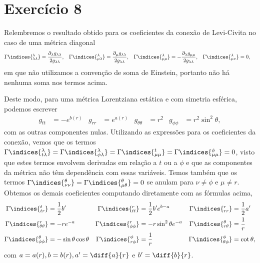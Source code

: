 \section*{Exercício 8}
Relembremos o resultado obtido para os coeficientes da conexão de Levi-Civita no caso de uma métrica diagonal
\begin{align*}
    \Gamma\indices{^\lambda_{\lambda\lambda}} &=\frac{\partial_{\lambda}g_{\lambda \lambda}}{2g_{\lambda \lambda}},&
    \Gamma\indices{^\lambda_{\mu\lambda}} &= \frac{\partial_{\mu}g_{\lambda \lambda}}{2g_{\lambda \lambda}},&
    \Gamma\indices{^\lambda_{\mu\mu}} &= -\frac{\partial_{\lambda}g_{\mu\mu}}{2g_{\lambda \lambda}},&
    \Gamma\indices{^\lambda_{\mu\nu}} &= 0,
\end{align*}
em que não utilizamos a convenção de soma de Einstein, portanto não há nenhuma soma nos termos acima.

Deste modo, para uma métrica Lorentziana estática e com simetria esférica, podemos escrever
\begin{align*}
    g_{tt} &= -e^{b(r)} &
    g_{rr} &= e^{a(r)}&
    g_{\theta\theta} &= r^2&
    g_{\phi\phi} &= r^2\sin^2\theta,
\end{align*}
com as outras componentes nulas. Utilizando as expressões para os coeficientes da conexão, vemos que os termos \(\Gamma\indices{^\lambda_{t \lambda}} = \Gamma\indices{^\lambda_{\phi \lambda}} = \Gamma\indices{^t_{\mu\mu}} = \Gamma\indices{^\phi_{\mu\mu}} = 0\), visto que estes termos envolvem derivadas em relação a \(t\) ou a \(\phi\) e que as componentes da métrica não têm dependência com essas variáveis. Temos também que os termos \(\Gamma\indices{^\theta_{\nu\nu}} = \Gamma\indices{^\theta_{\mu\theta}} = 0\) se anulam para \(\nu \neq \phi\) e \(\mu \neq r\). Obtemos os demais coeficientes computando diretamente com as fórmulas acima,
\begin{align*}
    \Gamma\indices{^t_{tr}} &= \frac12 b'&
    \Gamma\indices{^r_{tt}} &= \frac12 b' e^{b - a} &
    \Gamma\indices{^r_{rr}} &= \frac12 a'\\
    \Gamma\indices{^r_{\theta\theta}} &= -r e^{-a}&
    \Gamma\indices{^r_{\phi\phi}} &= -r \sin^2\theta e^{-a}&
    \Gamma\indices{^\theta_{r\theta}} &= \frac1r\\
    \Gamma\indices{^\theta_{\phi\phi}} &= -\sin\theta\cos\theta&
    \Gamma\indices{^\phi_{r\phi}} &= \frac1r&
    \Gamma\indices{^\phi_{\theta\phi}} &= \cot\theta,
\end{align*}
com \(a = a(r), b = b(r), a' = \diff{a}{r}\) e \(b' = \diff{b}{r}\).

